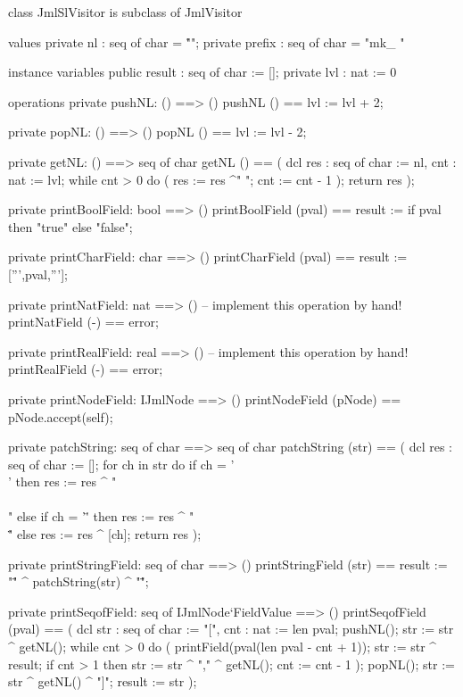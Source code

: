 \begin{vdm_al}
class JmlSlVisitor is subclass of JmlVisitor

values
  private nl : seq of char = "\r\n";
  private prefix : seq of char = "mk_ "

instance variables
  public result : seq of char := [];
  private lvl : nat := 0

operations
  private pushNL: () ==> ()
  pushNL () == lvl := lvl + 2;

  private popNL: () ==> ()
  popNL () == lvl := lvl - 2;

  private getNL: () ==> seq of char
  getNL () ==
    ( dcl res : seq of char := nl, cnt : nat := lvl;
      while cnt > 0 do ( res := res ^" "; cnt := cnt - 1 );
      return res );

  private printBoolField: bool ==> ()
  printBoolField (pval) ==
    result := if pval then "true" else "false";

  private printCharField: char ==> ()
  printCharField (pval) ==
    result := [''',pval,'''];

  private printNatField: nat ==> ()
  -- implement this operation by hand!
  printNatField (-) == error;

  private printRealField: real ==> ()
  -- implement this operation by hand!
  printRealField (-) == error;

  private printNodeField: IJmlNode ==> ()
  printNodeField (pNode) == pNode.accept(self);

  private patchString: seq of char ==> seq of char
  patchString (str) ==
   ( dcl res : seq of char := [];
     for ch in str do
       if ch = '\\' then res := res ^ "\\\\"
       else if ch = '\"' then res := res ^ "\\\""
       else res := res ^ [ch];
     return res );

  private printStringField: seq of char ==> ()
  printStringField (str) == result := "\"" ^ patchString(str) ^ "\"";

  private printSeqofField: seq of IJmlNode`FieldValue ==> ()
  printSeqofField (pval) ==
    ( dcl str : seq of char := "[", cnt : nat := len pval;
      pushNL();
      str := str ^ getNL();
      while cnt > 0 do
        ( printField(pval(len pval - cnt + 1));
          str := str ^ result;
          if cnt > 1
          then str := str ^ "," ^ getNL();
          cnt := cnt - 1 ); 
      popNL();
      str := str ^ getNL() ^ "]";
      result := str );


\end{vdm_al}
